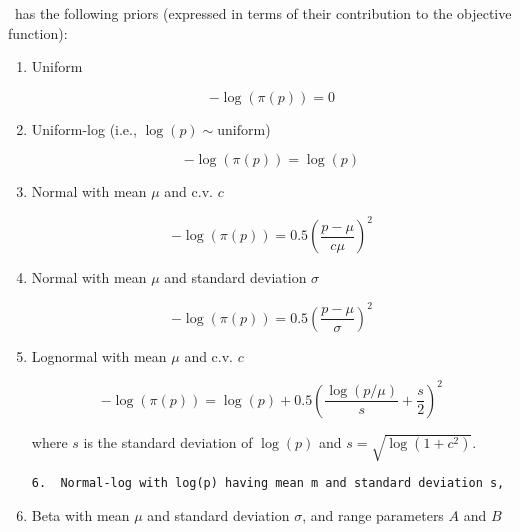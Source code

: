 \CNAME\ has the following priors (expressed in terms of their contribution to the objective function): 

\begin{enumerate}
\item{Uniform}

\begin{equation}
 - \log \left(\pi \left(p \right) \right) = 0
\end{equation}

\item{Uniform-log} (i.e., $\log(p) \sim \text{uniform}$)

\begin{equation}
 - \log \left(\pi \left(p \right) \right) = \log \left( p \right)
\end{equation}

\item{Normal with mean $\mu$ and c.v. $c$}

\begin{equation}
 - \log \left(\pi \left(p \right) \right) = 0.5\left(\frac{p - \mu}{c\mu} \right)^2 
\end{equation}

\item{Normal with mean $\mu$ and standard deviation $\sigma$}

\begin{equation}
 - \log \left(\pi \left(p \right) \right) = 0.5\left(\frac{p - \mu}
{\sigma }\right)^2
\end{equation}

\item{Lognormal with mean $\mu$ and c.v. $c$} 

\begin{equation}
 - \log \left(\pi \left(p \right) \right) = \log \left( p \right) + 0.5 \left( \frac{\log \left( p / \mu \right)}{s} + \frac{s}{2} \right)^2
\end{equation}

where $s$ is the standard deviation of $\log(p)$ and $s= \sqrt{\log \left(1+c^2 \right)}$.

\begin{lstlisting}
6.	Normal-log with log(p) having mean m and standard deviation s, 
\end{lstlisting}

\item{Beta with mean $\mu$ and standard deviation $\sigma$, and range parameters $A$ and $B$}


\end{enumerate}
